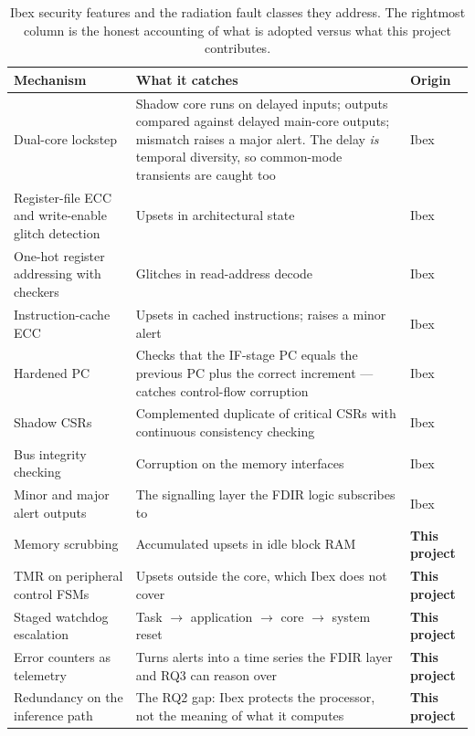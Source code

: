 \documentclass[11pt,a4paper]{article}
\begin{document}
\begin{table}[htbp]
\centering
\caption{Ibex security features and the radiation fault classes they address.
The rightmost column is the honest accounting of what is adopted versus what
this project contributes.}
\label{tab:secureibex}
\small
\begin{tabularx}{\textwidth}{@{}L{4.0cm} X L{2.3cm}@{}}
\toprule
\textbf{Mechanism} & \textbf{What it catches} & \textbf{Origin} \\
\midrule
Dual-core lockstep & Shadow core runs on delayed inputs; outputs compared
against delayed main-core outputs; mismatch raises a major alert. The delay
\emph{is} temporal diversity, so common-mode transients are caught too & Ibex \\
Register-file ECC and write-enable glitch detection & Upsets in architectural
state & Ibex \\
One-hot register addressing with checkers & Glitches in read-address decode &
Ibex \\
Instruction-cache ECC & Upsets in cached instructions; raises a minor alert &
Ibex \\
Hardened PC & Checks that the IF-stage PC equals the previous PC plus the
correct increment --- catches control-flow corruption & Ibex \\
Shadow CSRs & Complemented duplicate of critical CSRs with continuous
consistency checking & Ibex \\
Bus integrity checking & Corruption on the memory interfaces & Ibex \\
Minor and major alert outputs & The signalling layer the FDIR logic subscribes
to & Ibex \\
\midrule
Memory scrubbing & Accumulated upsets in idle block RAM &
\textbf{This project} \\
TMR on peripheral control FSMs & Upsets outside the core, which Ibex does not
cover & \textbf{This project} \\
Staged watchdog escalation & Task \(\rightarrow\) application \(\rightarrow\)
core \(\rightarrow\) system reset & \textbf{This project} \\
Error counters as telemetry & Turns alerts into a time series the FDIR layer and
RQ3 can reason over & \textbf{This project} \\
Redundancy on the inference path & The RQ2 gap: Ibex protects the processor, not
the meaning of what it computes & \textbf{This project} \\
\bottomrule
\end{tabularx}
\end{table}
\end{document}
